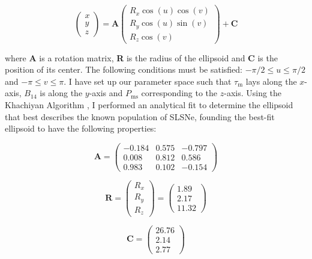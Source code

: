 \begin{equation}
\label{eq:Ellipsoid}
\left( \begin{matrix}
x \\
y \\
z
\end{matrix} \right)
=
\mathbf{A}
\left( \begin{matrix}
R_x\cos(u)\cos(v) \\
R_y\cos(u)\sin(v) \\
R_z\cos(v)
\end{matrix} \right)
+ \mathbf{C}
\end{equation}

\noindent where \textbf{A} is a rotation matrix, \textbf{R} is the radius of the ellipsoid and \textbf{C} is the position of its center. The following conditions must be satisfied: $-\pi /2 \leq u \leq \pi /2$ and $-\pi \leq v \leq \pi$. I have set up our parameter space such that $\tau_\mathrm{m}$ lays along the $x$-axis, $B_{14}$ is along the $y$-axis and $P_{\mathrm{ms}}$ corresponding to the $z$-axis. Using the Khachiyan Algorithm \citep{Aspvall1980,Khachiyan1980}, I performed an analytical fit to determine the ellipsoid that best describes the known population of SLSNe, founding the best-fit ellipsoid to have the following properties:

\begin{equation}
\label{eq:A}
\mathbf{A} =
\left( \begin{matrix}
-0.184 & 0.575 & -0.797\\
 0.008 & 0.812 & 0.586\\
0.983 & 0.102 & -0.154
\end{matrix} \right)
\end{equation}

\begin{equation}
\label{eq:R}
\mathbf{R} =
\left( \begin{matrix}
R_x \\
R_y \\
R_z
\end{matrix} \right)
=
\left( \begin{matrix}
1.89\\
2.17\\
11.32
\end{matrix} \right)
\end{equation}

\begin{equation}
\label{eq:C}
\mathbf{C} =
\left( \begin{matrix}
26.76 \\
2.14\\
2.77
\end{matrix} \right)
\end{equation}

